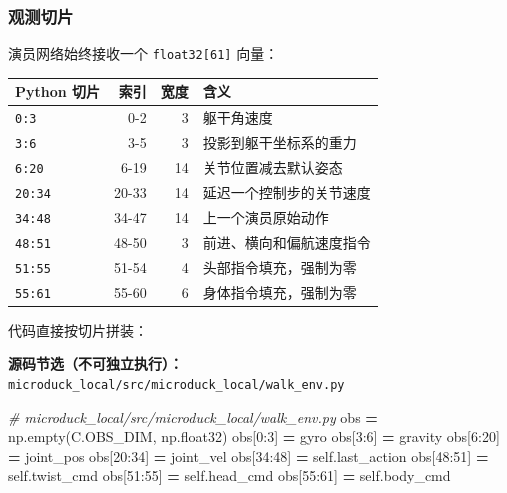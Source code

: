 \documentclass[
  chinese,
  11pt,
  letterpaper,
]{article}
\newenvironment{Shaded}{\begin{snugshade}}{\end{snugshade}}
\newcommand{\CommentTok}[1]{\textcolor[rgb]{0.56,0.35,0.01}{\textit{#1}}}
\newcommand{\DecValTok}[1]{\textcolor[rgb]{0.00,0.00,0.81}{#1}}
\newcommand{\NormalTok}[1]{#1}
\newcommand{\OperatorTok}[1]{\textcolor[rgb]{0.81,0.36,0.00}{\textbf{#1}}}
\newcommand{\VariableTok}[1]{\textcolor[rgb]{0.00,0.00,0.00}{#1}}
\newcounter{none} %
\renewenvironment{Shaded}{\par\smallskip}{\par\smallskip}
\begin{document}
\subsubsection{观测切片}\label{ux89c2ux6d4bux5207ux7247}

演员网络始终接收一个 \texttt{float32{[}61{]}} 向量：

{\def\LTcaptype{none} %
\begin{longtable}[]{@{}lrrl@{}}
\toprule\noalign{}
Python 切片 & 索引 & 宽度 & 含义 \\
\midrule\noalign{}
\endhead
\bottomrule\noalign{}
\endlastfoot
\texttt{0:3} & 0-2 & 3 & 躯干角速度 \\
\texttt{3:6} & 3-5 & 3 & 投影到躯干坐标系的重力 \\
\texttt{6:20} & 6-19 & 14 & 关节位置减去默认姿态 \\
\texttt{20:34} & 20-33 & 14 & 延迟一个控制步的关节速度 \\
\texttt{34:48} & 34-47 & 14 & 上一个演员原始动作 \\
\texttt{48:51} & 48-50 & 3 & 前进、横向和偏航速度指令 \\
\texttt{51:55} & 51-54 & 4 & 头部指令填充，强制为零 \\
\texttt{55:61} & 55-60 & 6 & 身体指令填充，强制为零 \\
\end{longtable}
}

代码直接按切片拼装：

\textbf{源码节选（不可独立执行）：}\texttt{microduc\allowbreak{}k\_\allowbreak{}local/\allowbreak{}src/\allowbreak{}microduc\allowbreak{}k\_\allowbreak{}local/\allowbreak{}walk\_\allowbreak{}env.py}

\begin{Shaded}
\begin{Highlighting}[]
\CommentTok{\# microduck\_local/src/microduck\_local/walk\_env.py}
\NormalTok{obs }\OperatorTok{=}\NormalTok{ np.empty(C.OBS\_DIM, np.float32)}
\NormalTok{obs[}\DecValTok{0}\NormalTok{:}\DecValTok{3}\NormalTok{] }\OperatorTok{=}\NormalTok{ gyro}
\NormalTok{obs[}\DecValTok{3}\NormalTok{:}\DecValTok{6}\NormalTok{] }\OperatorTok{=}\NormalTok{ gravity}
\NormalTok{obs[}\DecValTok{6}\NormalTok{:}\DecValTok{20}\NormalTok{] }\OperatorTok{=}\NormalTok{ joint\_pos}
\NormalTok{obs[}\DecValTok{20}\NormalTok{:}\DecValTok{34}\NormalTok{] }\OperatorTok{=}\NormalTok{ joint\_vel}
\NormalTok{obs[}\DecValTok{34}\NormalTok{:}\DecValTok{48}\NormalTok{] }\OperatorTok{=} \VariableTok{self}\NormalTok{.last\_action}
\NormalTok{obs[}\DecValTok{48}\NormalTok{:}\DecValTok{51}\NormalTok{] }\OperatorTok{=} \VariableTok{self}\NormalTok{.twist\_cmd}
\NormalTok{obs[}\DecValTok{51}\NormalTok{:}\DecValTok{55}\NormalTok{] }\OperatorTok{=} \VariableTok{self}\NormalTok{.head\_cmd}
\NormalTok{obs[}\DecValTok{55}\NormalTok{:}\DecValTok{61}\NormalTok{] }\OperatorTok{=} \VariableTok{self}\NormalTok{.body\_cmd}
\end{Highlighting}
\end{Shaded}
\end{document}
